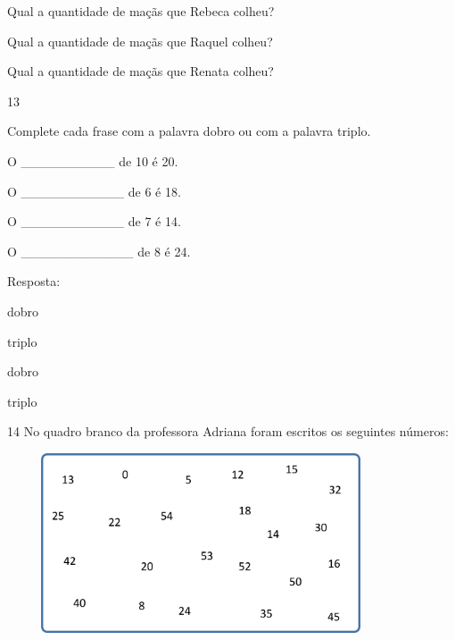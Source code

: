 \begin{escolha}

\begin{escolha}

\item
  Qual a quantidade de maçãs que Rebeca colheu?

\item
  Qual a quantidade de maçãs que Raquel colheu?

\item
  Qual a quantidade de maçãs que Renata colheu?
\end{escolha}

\num{13}

Complete cada frase com a palavra dobro ou com a palavra triplo.

\begin{escolha}

\item
  O \_\_\_\_\_\_\_\_\_\_ de 10 é 20.
\item
  O \_\_\_\_\_\_\_\_\_\_\_ de 6 é 18.
\item
  O \_\_\_\_\_\_\_\_\_\_\_ de 7 é 14.
\item
  O \_\_\_\_\_\_\_\_\_\_\_\_ de 8 é 24.
\end{escolha}

Resposta:

\begin{escolha}

\item
  dobro
\item
  triplo
\item
  dobro
\item
  triplo
\end{escolha}

\num{14} No quadro branco da professora Adriana foram escritos os seguintes números:


\includegraphics[width=4.51706in,height=2.09185in]{media/image25.png}


\end{escolha}
